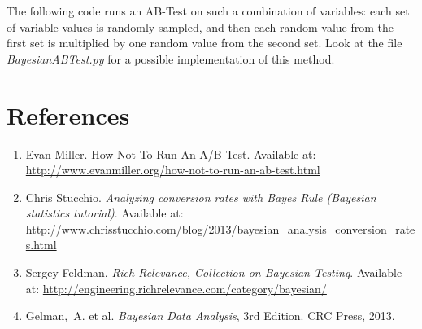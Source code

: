 \documentclass[11pt, a4wide]{article}   	%
\begin{document}
The following code runs an AB-Test on such a combination of variables: each set of variable values is randomly sampled, and then each random value from the first set is multiplied by one random value from the second set. Look at the file \emph{BayesianABTest.py} for a possible implementation of this method.

\section{References}
\begin{enumerate}
\item Evan Miller. How Not To Run An A/B Test.
Available at: \url{http://www.evanmiller.org/how-not-to-run-an-ab-test.html}
\item Chris Stucchio. \emph{Analyzing conversion rates with Bayes Rule (Bayesian statistics tutorial)}. Available at: \url{http://www.chrisstucchio.com/blog/2013/bayesian_analysis_conversion_rates.html}
\item Sergey Feldman. \emph{Rich Relevance, Collection on Bayesian Testing}. Available at: \url{http://engineering.richrelevance.com/category/bayesian/}
\item Gelman,~A. et al. \emph{Bayesian Data Analysis}, 3rd Edition. CRC Press, 2013.
\end{enumerate}
\end{document}
